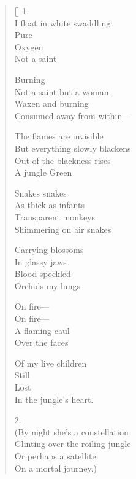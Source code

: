 \settowidth{\versewidth}{My bridal sandals are made of clay}
\begin{verse}[\versewidth]
1.\\
I float in white swaddling\\
Pure\\
Oxygen\\
Not a saint

Burning\\
Not a saint but a woman\\
Waxen and burning\\
Consumed away from within---

The flames are invisible\\
But everything slowly blackens\\
Out of the blackness rises\\
A jungle     Green

Snakes   snakes\\
As thick as infants\\
Transparent monkeys\\
Shimmering on air     snakes

Carrying blossoms\\
In glassy jaws\\
Blood-speckled\\
Orchids     my lungs

On fire---\\
On fire---\\
A flaming caul\\
Over the faces

Of my live children\\
Still\\
Lost\\
In the jungle's heart.



2.\\
(By night she's a constellation\\
Glinting over the roiling jungle\\
Or perhaps a satellite\\
On a mortal journey.)




































\end{verse}
